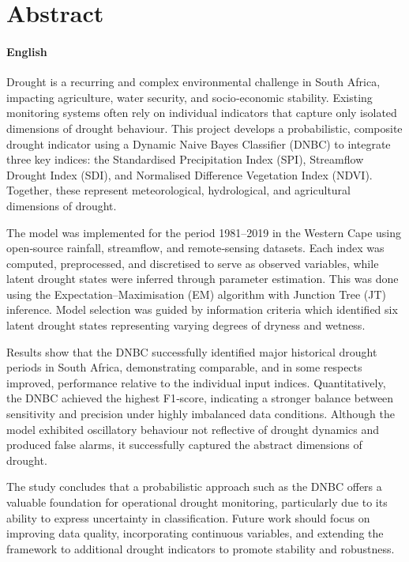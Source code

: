 \chapter*{Abstract}
\makeatletter{}\makeatother

\subsubsection*{English}

Drought is a recurring and complex environmental challenge in South Africa, impacting agriculture, water security, and socio‐economic stability. Existing monitoring systems often rely on individual indicators that capture only isolated dimensions of drought behaviour. This project develops a probabilistic, composite drought indicator using a Dynamic Naive Bayes Classifier (DNBC) to integrate three key indices: the Standardised Precipitation Index (SPI), Streamflow Drought Index (SDI), and Normalised Difference Vegetation Index (NDVI). Together, these represent meteorological, hydrological, and agricultural dimensions of drought.

The model was implemented for the period 1981–2019 in the Western Cape using open‐source rainfall, streamflow, and remote‐sensing datasets. Each index was computed, preprocessed, and discretised to serve as observed variables, while latent drought states were inferred through parameter estimation. This was done using the Expectation–Maximisation (EM) algorithm with Junction Tree (JT) inference. Model selection was guided by information criteria which identified six latent drought states representing varying degrees of dryness and wetness.

Results show that the DNBC successfully identified major historical drought periods in South Africa, demonstrating comparable, and in some respects improved, performance relative to the individual input indices. Quantitatively, the DNBC achieved the highest F1‐score, indicating a stronger balance between sensitivity and precision under highly imbalanced data conditions. Although the model exhibited oscillatory behaviour not reflective of drought dynamics and produced false alarms, it successfully captured the abstract dimensions of drought. 

The study concludes that a probabilistic approach such as the DNBC offers a valuable foundation for operational drought monitoring, particularly due to its ability to express uncertainty in classification. Future work should focus on improving data quality, incorporating continuous variables, and extending the framework to additional drought indicators to promote stability and robustness.


